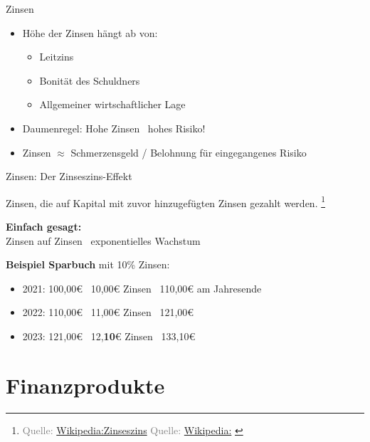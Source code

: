 \documentclass{beamer}
\newcommand{\n}{\hfill\\\vspace{0.25cm}}
\let\oldfootnote\footnote
\renewcommand{\footnote}[1]
{%
	\oldfootnote
	{
		\tiny
		\textcolor{gray}{#1}
	}%
}
\newcommand{\citewiki}[2][]
{%
	\footnote
	{
		\ifthenelse{\isempty{#1}}
		{
			Quelle: \href{https://de.wikipedia.org/wiki/#2}{Wikipedia:#2}
		}
		{
			Quelle: \href{https://de.wikipedia.org/wiki/#2}{Wikipedia:#1}
		}
	}
}
\begin{document}
			\begin{frame}{Zinsen}
				\begin{itemize}
					\item Höhe der Zinsen hängt ab von:
					\begin{itemize}
						\item Leitzins
						\item Bonität des Schuldners
						\item Allgemeiner wirtschaftlicher Lage
					\end{itemize}
					\item Daumenregel: Hohe Zinsen \textrightarrow\ hohes Risiko!
					\item Zinsen $\approx$ Schmerzensgeld / Belohnung für eingegangenes Risiko
				\end{itemize}
			\end{frame}
		
			\begin{frame}{Zinsen: Der Zinseszins-Effekt}
				\begin{definition}
					Zinsen, die auf Kapital mit zuvor hinzugefügten Zinsen gezahlt werden.\citewiki{Zinseszins}
				\end{definition}
				\textbf{Einfach gesagt:}\\
				Zinsen auf Zinsen \textrightarrow\ exponentielles Wachstum\n
				
				\textbf{Beispiel Sparbuch} mit 10\% Zinsen:
				\begin{itemize}
					\item 2021: 100,00€ \textrightarrow\ 10,00€ Zinsen \textrightarrow\ 110,00€ am Jahresende
					\item 2022: 110,00€ \textrightarrow\ 11,00€ Zinsen \textrightarrow\ 121,00€
					\item 2023: 121,00€ \textrightarrow\ 12,\textbf{10}€ Zinsen \textrightarrow\ 133,10€
				\end{itemize}
			\end{frame}
	
	\section{Finanzprodukte}
	
		\begin{frame}
		\end{frame}
	
\end{document}
